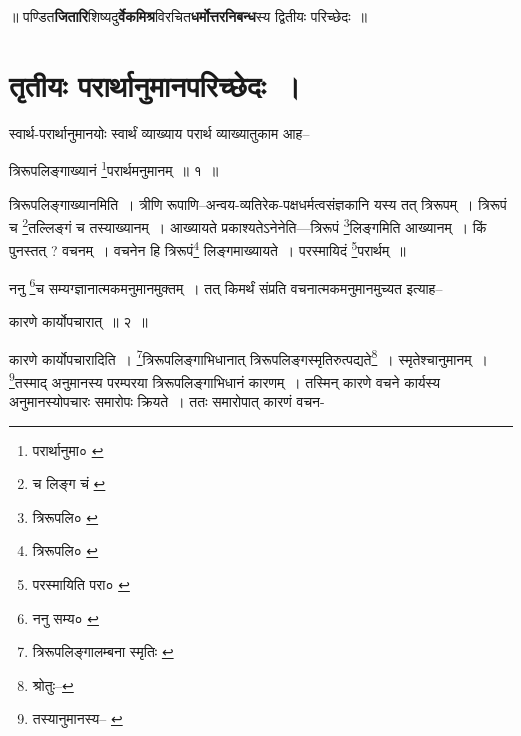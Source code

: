 \documentclass[article,12pt,a4paper]{memoir}
\begin{document}
	  \pstart ॥ पण्डित\textbf{जितारि}शिष्यदु\textbf{र्वेकमिश्र}विरचित\textbf{धर्मोत्तरनिबन्ध}स्य द्वितीयः परिच्छेदः ॥
	\pend
      
	    
	    \endnumbering%
	    \endgroup
	    
	  
	  
	
	    
	    \begingroup
	    \beginnumbering%
	    
	  
\chapter[{तृतीयः परार्थानुमानपरिच्छेदः ।}]{तृतीयः परार्थानुमानपरिच्छेदः ।}\leavevmode{}
	  \bigskip
	  \begingroup
	

	  \pstart स्वार्थ-परार्थानुमानयोः स्वार्थं व्याख्याय परार्थ व्याख्यातुकाम आह--
	\pend
       
	  \bigskip
	  \begingroup
	

	  \pstart त्रिरूपलिङ्गाख्यानं \footnote{परार्थानुमा० \cite{dp-msB} \cite{dp-edP} \cite{dp-edH} \cite{dp-edE} \cite{dp-edN}}परार्थमनुमानम् ॥ १ ॥
	\pend
      
	  \endgroup
	 

	  \pstart त्रिरूपलिङ्गाख्यानमिति । त्रीणि रूपाणि--अन्वय-व्यतिरेक-पक्षधर्मत्वसंज्ञकानि यस्य तत् त्रिरूपम् । त्रिरूपं च \footnote{च लिङ्ग चं \cite{dp-msA}}तल्लिङ्गं च तस्याख्यानम् । आख्यायते प्रकाश्यतेऽनेनेति—त्रिरूपं \footnote{त्रिरूपलि० \cite{dp-edE}}लिङ्गमिति आख्यानम् । किं पुनस्तत् ? वचनम् । वचनेन हि त्रिरूपं\footnote{त्रिरूपलि० \cite{dp-msC}} लिङ्गमाख्यायते । परस्मायिदं \footnote{परस्मायिति परा० \cite{dp-edE}}परार्थम् ॥
	\pend
       

	  \pstart ननु \footnote{ननु सम्य० \cite{dp-msA}}च सम्यग्ज्ञानात्मकमनुमानमुक्तम् । तत् किमर्थं संप्रति वचनात्मकमनुमानमुच्यत इत्याह--
	\pend
       
	  \bigskip
	  \begingroup
	

	  \pstart कारणे कार्योपचारात् ॥ २ ॥
	\pend
      
	  \endgroup
	 

	  \pstart कारणे कार्योपचारादिति । \footnote{त्रिरूपलिङ्गालम्बना स्मृतिः \cite{dp-msC} \cite{dp-msD} \cite{dp-msB}}त्रिरूपलिङ्गाभिधानात् त्रिरूपलिङ्गस्मृतिरुत्पद्यते\footnote{श्रोतुः--\cite{dp-msD-n}} । स्मृतेश्चानुमानम् । \footnote{तस्यानुमानस्य--\cite{dp-msA} \cite{dp-msB} \cite{dp-edP} \cite{dp-edH} \cite{dp-edE} \cite{dp-edN}}तस्माद् अनुमानस्य परम्परया त्रिरूपलिङ्गाभिधानं कारणम् । तस्मिन् कारणे वचने कार्यस्य अनुमानस्योपचारः समारोपः क्रियते । ततः समारोपात् कारणं वचन-
	\pend
      
\end{document}
